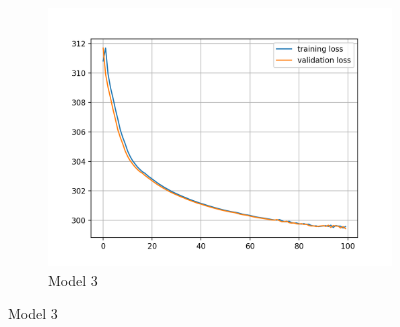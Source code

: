 \documentclass[a4paper,10pt]{article}
\begin{document}
\begin{figure}[htbp]
\begin{subfigure}{0.3\textwidth}
    \includegraphics[width=\textwidth]{figures/assignment_3/segmentation_model3_hist.png}
    \caption{Model 3}
    \label{fig:image3}
  \end{subfigure}
  \label{fig:all_images}

  \vfill


\end{figure}
\end{document}
